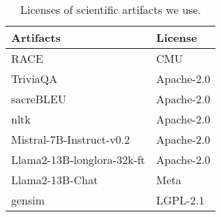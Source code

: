 \begin{table}[h]
\renewcommand\arraystretch{1.1}
\centering
\small
\begin{tabular}{ll}
\bottomrule
\textbf{Artifacts} & \textbf{License}\\
\hline
RACE & CMU\\
TriviaQA & Apache-2.0\\
sacreBLEU & Apache-2.0\\
nltk & Apache-2.0\\
Mistral-7B-Instruct-v0.2 & Apache-2.0\\
Llama2-13B-longlora-32k-ft &  Apache-2.0\\
Llama2-13B-Chat & Meta\\
gensim & LGPL-2.1\\
\toprule
\end{tabular}
\caption{Licenses of scientific artifacts we use.}
\label{tab:license}
\end{table}